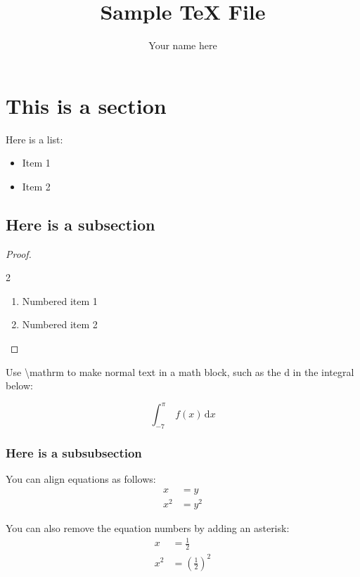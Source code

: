 \documentclass[12pt]{article}
\newcommand{\parens}[1]{\left(#1\right)}
\newcommand{\gap}{\vspace{3mm}}
\begin{document}
\title{Sample TeX File}
\author{Your name here}
\date{}

\maketitle

\tableofcontents{}
\pagebreak

\section{This is a section}
Here is a list:
\begin{itemize}[noitemsep, topsep=0pt, label=-]
\item Item 1
\item Item 2
\end{itemize}

\gap

\subsection{Here is a subsection}
\begin{proof} \quad %
\begin{spreadlines}{2\baselineskip}
\begin{enumerate}[label=(\alph*)]
\item Numbered item 1
\item Numbered item 2
\end{enumerate}
\end{spreadlines}
\end{proof}

Use \textbackslash{}mathrm to make normal text in a math block, such as the d in the integral below:

\begin{equation}
\int_{-7}^{\pi } \; f(x) \, \mathrm{d}x
\end{equation}

\gap

\subsubsection{Here is a subsubsection}
You can align equations as follows:
\begin{align}
x&=y\\
x^2&=y^2
\end{align}

You can also remove the equation numbers by adding an asterisk:
\begin{align*}
x&=\frac{1}{2}\\
x^2&=\parens{\frac{1}{2}}^2
\end{align*}
\end{document}
